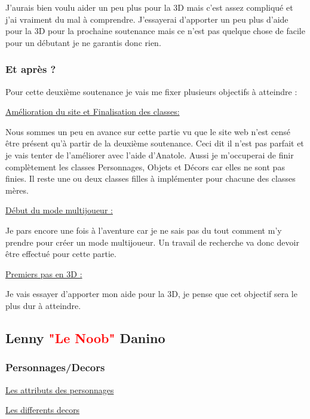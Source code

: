 \documentclass{article}
\begin{document}
\par
J'aurais bien voulu aider un peu plus pour la 3D mais c'est assez compliqué et j'ai vraiment du mal à comprendre. J'essayerai d'apporter un peu plus d'aide pour la 3D pour la prochaine soutenance mais ce n'est pas quelque chose de facile pour un débutant je ne garantis donc rien.
\newline

\subsubsection{Et après ?}
\par
Pour cette deuxième soutenance je vais me fixer plusieurs objectifs à atteindre :
\newline

\par
\underline{Amélioration du site et Finalisation des classes:}
\newline
\par
Nous sommes un peu en avance sur cette partie vu que le site web n'est censé être présent qu'à partir de la deuxième soutenance. Ceci dit il n'est pas parfait et je vais tenter de l'améliorer avec l'aide d'Anatole.
Aussi je m'occuperai de finir complètement les classes Personnages, Objets et Décors car elles ne sont pas finies. Il reste une ou deux classes filles à implémenter pour chacune des classes mères.
\newline

\par
\underline{Début du mode multijoueur :}
\newline
\par
Je pars encore une fois à l'aventure car je ne sais pas du tout comment m'y prendre pour créer un mode multijoueur. Un travail de recherche va donc devoir être effectué pour cette partie.
\newline

\par
\underline{Premiers pas en 3D :}
\par
Je vais essayer d'apporter mon aide pour la 3D, je pense que cet objectif sera le plus dur à atteindre.

\newpage

\subsection{Lenny \textcolor{red}{"Le Noob"} Danino}
\subsubsection{Personnages/Decors}

\par
\underline{Les attributs des personnages}
\newline

\par

\underline{Les differents decors}
\newline
\end{document}
